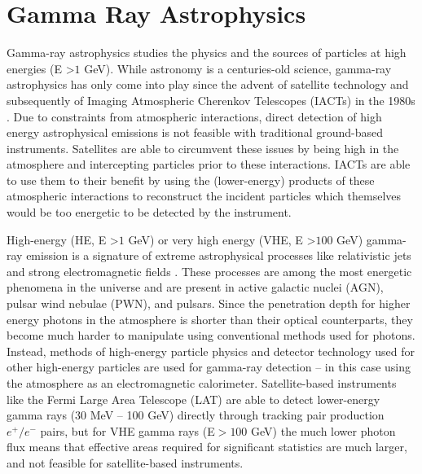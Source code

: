 \documentclass[main.tex]{subfiles}
\begin{document}
\section{Gamma Ray Astrophysics}
Gamma-ray astrophysics studies the physics and the sources of particles at high energies (E >$1$ GeV). While astronomy is a centuries-old science, gamma-ray astrophysics has only come into play since the advent of satellite technology and subsequently of Imaging Atmospheric Cherenkov Telescopes (IACTs) in the 1980s \cite{IACTs_1980}\cite{Weekes:1989}. Due to constraints from atmospheric interactions, direct detection of high energy astrophysical emissions is not feasible with traditional ground-based instruments. Satellites are able to circumvent these issues by being high in the atmosphere and intercepting particles prior to these interactions. IACTs are able to use them to their benefit by using the (lower-energy) products of these atmospheric interactions to reconstruct the incident particles which themselves would be too energetic to be detected by the instrument.\par

High-energy (HE, E >$1$ GeV) or very high energy (VHE, E >$100$ GeV) gamma-ray emission is a signature of extreme astrophysical processes like relativistic jets and strong electromagnetic fields \cite{cta_web}. These processes are among the most energetic phenomena in the universe and are present in active galactic nuclei (AGN), pulsar wind nebulae (PWN), and pulsars. Since the penetration depth for higher energy photons in the atmosphere is shorter than their optical counterparts, they become much harder to manipulate using conventional methods used for photons. Instead, methods of high-energy particle physics and detector technology used for other high-energy particles are used for gamma-ray detection -- in this case using the atmosphere as an electromagnetic calorimeter. Satellite-based instruments like the Fermi Large Area Telescope (LAT) are able to detect lower-energy gamma rays (30 MeV -- 100 GeV) directly through tracking pair production $e^+/e^-$ pairs, but for VHE gamma rays (E$> 100$ GeV) the much lower photon flux means that effective areas required for significant statistics are much larger, and not feasible for satellite-based instruments.
\end{document}
